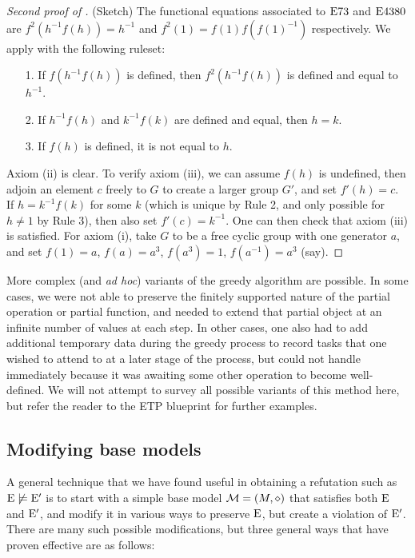 \begin{proof}[Second proof of ] (Sketch)  The functional equations associated to $\mathrm{E}73$ and $\mathrm{E}4380$ are
$f^2(h^{-1} f(h)) =h^{-1}$ and $f^2(1) = f(1) f(f(1)^{-1})$ respectively.  We apply  with the following ruleset:
\begin{itemize}
  \item[1.]  If $f(h^{-1} f(h))$ is defined, then $f^2(h^{-1} f(h))$ is defined and equal to $h^{-1}$.
  \item[2.]  If $h^{-1} f(h)$ and $k^{-1} f(k)$ are defined and equal, then $h=k$.
  \item[3.]  If $f(h)$ is defined, it is not equal to $h$.
\end{itemize}
Axiom (ii) is clear.  To verify axiom (iii), we can assume $f(h)$ is undefined, then adjoin an element $c$ freely to $G$ to create a larger group $G'$, and set $f'(h) = c$.  If $h = k^{-1} f(k)$ for some $k$ (which is unique by Rule 2, and only possible for $h \neq 1$ by Rule 3), then also set $f'(c) = k^{-1}$.  One can then check that axiom (iii) is satisfied.  For axiom (i), take $G$ to be a free cyclic group with one generator $a$, and set $f(1) = a$, $f(a) = a^3$, $f(a^3) = 1$, $f(a^{-1}) = a^3$ (say).
\end{proof}

More complex (and \emph{ad hoc}) variants of the greedy algorithm are possible.  In some cases, we were not able to preserve the finitely supported nature of the partial operation or partial function, and needed to extend that partial object at an infinite number of values at each step.  In other cases, one also had to add additional temporary data during the greedy process to record tasks that one wished to attend to at a later stage of the process, but could not handle immediately because it was awaiting some other operation to become well-defined.  We will not attempt to survey all possible variants of this method here, but refer the reader to the ETP blueprint for further examples.

\subsection{Modifying base models}\label{modify-base}

A general technique that we have found useful in obtaining a refutation such as $\mathrm{E} \not\models {\mathrm{E}'}$ is to start with a simple base model ${\mathcal{M}} = (M,\diamond)$ that satisfies both $\mathrm{E}$ and ${\mathrm{E}'}$, and modify it in various ways to preserve $\mathrm{E}$, but create a violation of ${\mathrm{E}'}$.  There are many such possible modifications, but three general ways that have proven effective are as follows:

